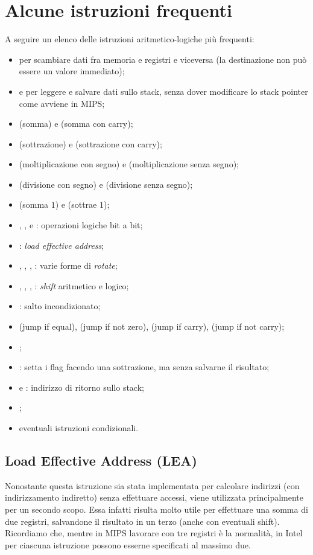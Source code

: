 \section{Alcune istruzioni frequenti}
A seguire un elenco delle istruzioni aritmetico-logiche più frequenti:
\begin{itemize}
	\item {} per scambiare dati fra memoria e registri e viceversa (la destinazione non può essere un valore immediato);
	\item {} e  per leggere e salvare dati sullo stack, senza dover modificare lo stack pointer come avviene in MIPS;
	\item {} (somma) e  (somma con carry);
	\item {} (sottrazione) e  (sottrazione con carry);
	\item {} (moltiplicazione con segno) e  (moltiplicazione senza segno);
	\item {} (divisione con segno) e  (divisione senza segno);
	\item {} (somma \(1\)) e  (sottrae \(1\));
	\item {}, ,  e : operazioni logiche bit a bit;
	\item {}: \emph{load effective address};
	\item {}, , , : varie forme di \emph{rotate};
	\item {}, , , : \emph{shift} aritmetico e logico;
	\item {}: salto incondizionato;
	\item {} (jump if equal),  (jump if not zero),  (jump if carry),  (jump if not carry);
	\item {};
	\item {}: setta i flag facendo una sottrazione, ma senza salvarne il risultato;
	\item {} e : indirizzo di ritorno sullo stack;
	\item {};
	\item eventuali istruzioni condizionali.
\end{itemize}

\subsection{Load Effective Address (LEA)}
Nonostante questa istruzione sia stata implementata per calcolare indirizzi (con indirizzamento indiretto) senza effettuare accessi, viene utilizzata principalmente per un secondo scopo. Essa infatti risulta molto utile per effettuare una somma di due registri, salvandone il risultato in un terzo (anche con eventuali shift). Ricordiamo che, mentre in MIPS lavorare con tre registri è la normalità, in Intel per ciascuna istruzione possono esserne specificati al massimo due.

